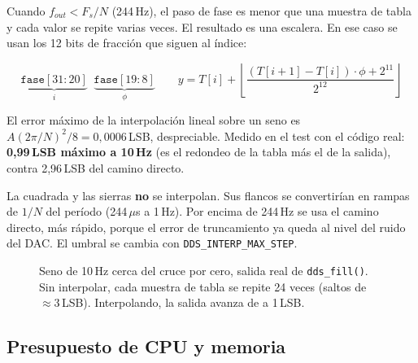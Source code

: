 \documentclass[11pt,a4paper]{article}
\begin{document}
Cuando $f_{out} < F_s/N$ (244\,Hz), el paso de fase es menor que una muestra de
tabla y cada valor se repite varias veces. El resultado es una escalera. En ese
caso se usan los 12 bits de fracción que siguen al índice:

\begin{equation}
\underbrace{\texttt{fase}[31{:}20]}_{i}\;\;
\underbrace{\texttt{fase}[19{:}8]}_{\phi}\qquad
y = T[i] + \left\lfloor\frac{(T[i+1]-T[i])\cdot\phi + 2^{11}}{2^{12}}\right\rfloor
\end{equation}

El error máximo de la interpolación lineal sobre un seno es
$A(2\pi/N)^2/8 = 0{,}0006$\,LSB, despreciable. Medido en el test con el código
real: \textbf{0,99\,LSB máximo a 10\,Hz} (es el redondeo de la tabla más el de
la salida), contra 2,96\,LSB del camino directo.

La cuadrada y las sierras \textbf{no} se interpolan. Sus flancos se convertirían
en rampas de $1/N$ del período (244\,$\mu$s a 1\,Hz). Por encima de 244\,Hz se
usa el camino directo, más rápido, porque el error de truncamiento ya queda al
nivel del ruido del DAC. El umbral se cambia con \texttt{DDS\_INTERP\_MAX\_STEP}.

\begin{figure}[h]
\centering
{}
\caption{Seno de 10\,Hz cerca del cruce por cero, salida real de \texttt{dds\_fill()}.
Sin interpolar, cada muestra de tabla se repite 24 veces (saltos de $\approx 3$\,LSB).
Interpolando, la salida avanza de a 1\,LSB.}
\end{figure}

\subsection{Presupuesto de CPU y memoria}
\end{document}

